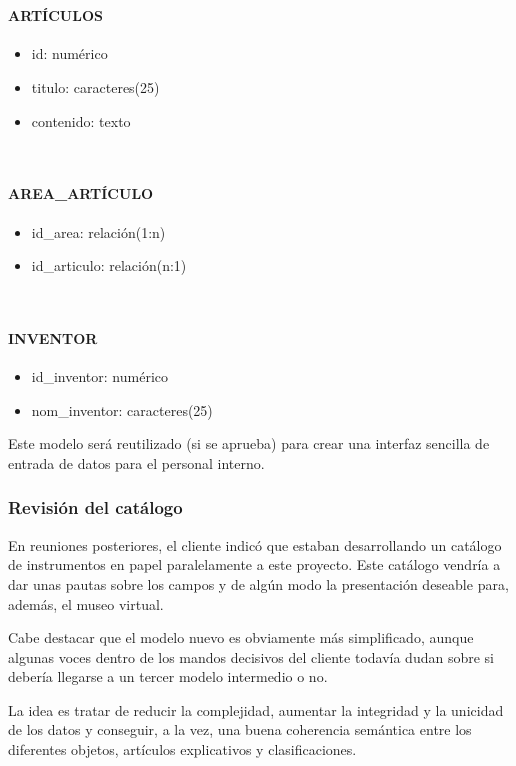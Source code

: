 ~\paragraph{ARTÍCULOS}
\begin{itemize}
\item id: numérico
\item titulo: caracteres(25)
\item contenido: texto
\end{itemize}

~\paragraph{AREA\_ARTÍCULO}
\begin{itemize}
\item id\_area: relación(1:n)
\item id\_articulo: relación(n:1)
\end{itemize}

~\paragraph{INVENTOR}
\begin{itemize}
\item id\_inventor: numérico
\item nom\_inventor: caracteres(25)
\end{itemize}

\par Este modelo será reutilizado (si se aprueba) para crear una interfaz sencilla de entrada de datos para el personal interno.

\subsubsection{Revisión del catálogo}

\par En reuniones posteriores, el cliente indicó que estaban desarrollando un catálogo de instrumentos en papel paralelamente a este proyecto. Este catálogo vendría a dar unas pautas sobre los campos y de algún modo la presentación deseable para, además, el museo virtual.

\par Cabe destacar que el modelo nuevo es obviamente más simplificado, aunque algunas voces dentro de los mandos decisivos del cliente todavía dudan sobre si debería llegarse a un tercer modelo intermedio o no.

\par La idea es tratar de reducir la complejidad, aumentar la integridad y la unicidad de los datos y conseguir, a la vez, una buena coherencia semántica entre los diferentes objetos, artículos explicativos y clasificaciones.

